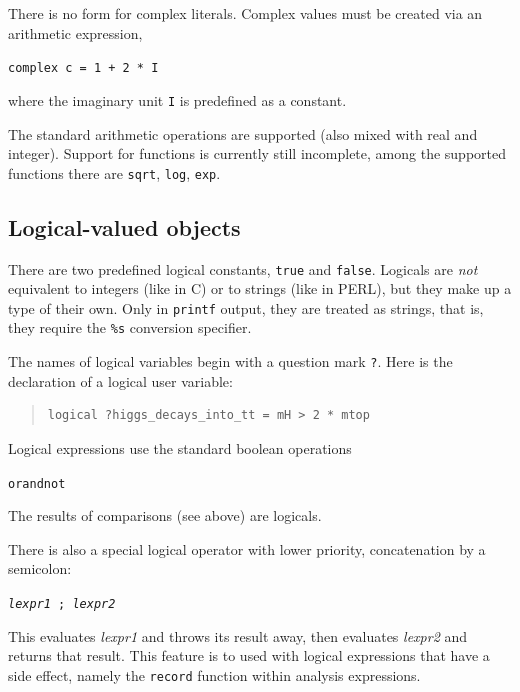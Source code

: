 \documentclass[12pt]{book}
\newcommand{\ttt}[1]{\texttt{#1}}
\begin{document}
There is no form for complex literals.  Complex values must be created via an
arithmetic expression,
\begin{center}
  \ttt{complex c = 1 + 2 * I}
\end{center}
where the imaginary unit \ttt{I} is predefined as a constant.

The standard arithmetic operations are supported (also mixed with real and
integer).  Support for functions is currently still incomplete, among the
supported functions there are \ttt{sqrt}, \ttt{log}, \ttt{exp}.



\subsection{Logical-valued objects}

There are two predefined logical constants, \ttt{true} and \ttt{false}.
Logicals are \emph{not} equivalent to integers (like in C) or to strings (like
in PERL), but they make up a type of their own.  Only in \verb|printf| output,
they are treated as strings, that is, they require the \verb|%s| conversion
specifier.

The names of logical variables begin with a question mark \ttt{?}.  Here is
the declaration of a logical user variable:
\begin{quote}
\begin{footnotesize}
\begin{footnotesize}
\begin{verbatim}
logical ?higgs_decays_into_tt = mH > 2 * mtop
\end{verbatim}
\end{footnotesize}
\end{footnotesize}
\end{quote}

Logical expressions use the standard boolean operations
\begin{center}
  \ttt{or}\quad \ttt{and}\quad \ttt{not}
\end{center}
The results of comparisons (see above) are logicals.

There is also a special logical operator with lower priority, concatenation by
a semicolon:
\begin{center}
  \ttt{\textit{lexpr1} ; \textit{lexpr2}}
\end{center}
This evaluates \textit{lexpr1} and throws its result away, then evaluates
\textit{lexpr2} and returns that result.  This feature is to used with logical
expressions that have a side effect, namely the \ttt{record} function within
analysis expressions.
\end{document}
